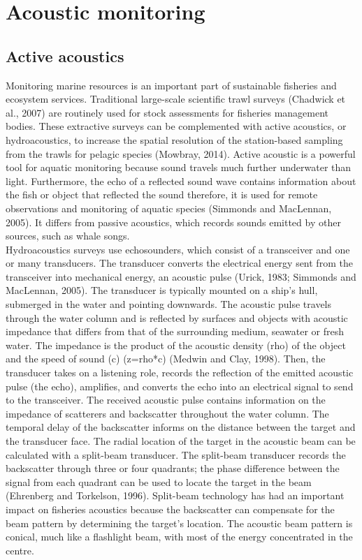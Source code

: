 \section{Acoustic monitoring}
\subsection{Active acoustics}
Monitoring marine resources is an important part of sustainable fisheries and ecosystem services. Traditional large-scale scientific trawl surveys (Chadwick et al., 2007) are routinely used for stock assessments for fisheries management bodies. These extractive surveys can be complemented with active acoustics, or hydroacoustics, to increase the spatial resolution of the station-based sampling from the trawls for pelagic species (Mowbray, 2014). Active acoustic is a powerful tool for aquatic monitoring because sound travels much further underwater than light. Furthermore, the echo of a reflected sound wave contains information about the fish or object that reflected the sound therefore, it is used for remote observations and monitoring of aquatic species (Simmonds and MacLennan, 2005). It differs from passive acoustics, which records sounds emitted by other sources, such as whale songs. \\

Hydroacoustics surveys use echosounders, which consist of a transceiver and one or many transducers. The transducer converts the electrical energy sent from the transceiver into mechanical energy, an acoustic pulse (Urick, 1983; Simmonds and MacLennan, 2005). The transducer is typically mounted on a ship's hull, submerged in the water and pointing downwards. The acoustic pulse travels through the water column and is reflected by surfaces and objects with acoustic impedance that differs from that of the surrounding medium, seawater or fresh water. The impedance is the product of the acoustic density (rho) of the object and the speed of sound (c) (z=rho*c) (Medwin and Clay, 1998). Then, the transducer takes on a listening role, records the reflection of the emitted acoustic pulse (the echo), amplifies, and converts the echo into an electrical signal to send to the transceiver. The received acoustic pulse contains information on the impedance of scatterers and backscatter throughout the water column. The temporal delay of the backscatter informs on the distance between the target and the transducer face. The radial location of the target in the acoustic beam can be calculated with a split-beam transducer. The split-beam transducer records the backscatter through three or four quadrants; the phase difference between the signal from each quadrant can be used to locate the target in the beam (Ehrenberg and Torkelson, 1996). Split-beam technology has had an important impact on fisheries acoustics because the backscatter can compensate for the beam pattern by determining the target's location. The acoustic beam pattern is conical, much like a flashlight beam, with most of the energy concentrated in the centre. \\

